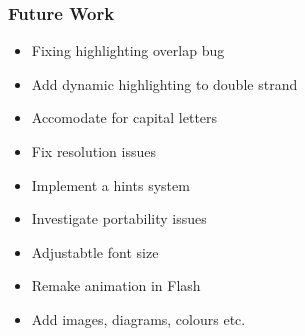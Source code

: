 \frame{\titlepage}
\begin{frame}
\frametitle{Future Work}
\begin{itemize}
\item Fixing highlighting overlap bug
\item Add dynamic highlighting to double strand
\item Accomodate for capital letters
\item Fix resolution issues 
\item Implement a hints system
\item Investigate portability issues
\item Adjustabtle font size
\item Remake animation in Flash
\item Add images, diagrams, colours etc.
\end{itemize}
\end{frame}    


